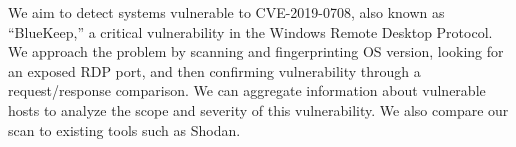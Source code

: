 We aim to detect systems vulnerable to CVE-2019-0708, also known as ``BlueKeep,'' a critical vulnerability in the Windows Remote Desktop Protocol. We approach the problem by scanning and fingerprinting OS version, looking for an exposed RDP port, and then confirming vulnerability through a request/response comparison. We can aggregate information about vulnerable hosts to analyze the scope and severity of this vulnerability. We also compare our scan to existing tools such as Shodan.

